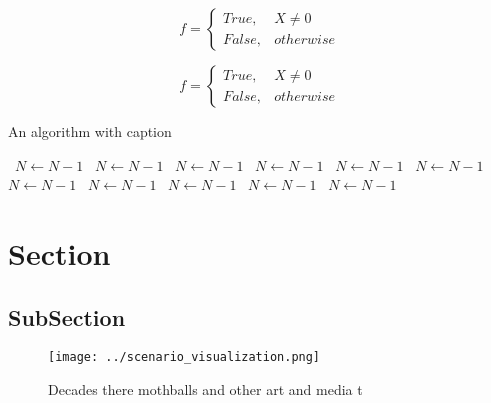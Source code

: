 \documentclass[a4paper]{article}
\begin{document}
\begin{equation}   f =
\begin{cases} True, & X \neq 0\\
False, & otherwise
\end{cases}
\end{equation}

\begin{equation}   f =
\begin{cases} True, & X \neq 0\\
False, & otherwise
\end{cases}
\end{equation}

\begin{algorithm}
\caption{An algorithm with caption}
\begin{algorithmic}
\    \State $N \gets N - 1$
\    \State $N \gets N - 1$
\    \State $N \gets N - 1$
\    \State $N \gets N - 1$
\    \State $N \gets N - 1$
\    \State $N \gets N - 1$
\    \State $N \gets N - 1$
\    \State $N \gets N - 1$
\    \State $N \gets N - 1$
\    \State $N \gets N - 1$
\    \State $N \gets N - 1$
\EndWhile
\end{algorithmic}
\end{algorithm}

\section{Section}

\subsection{SubSection}

\begin{figure}
\centering
\texttt{[image: ../scenario\_visualization.png]}
\caption{Decades there mothballs and other art and media t
}
\end{figure}
 
\end{document}
